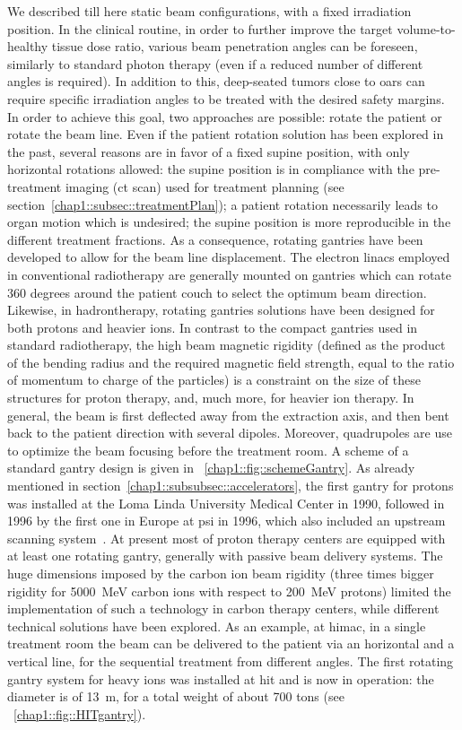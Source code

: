 We described till here static beam configurations,  with a fixed irradiation position. In the clinical routine, in order to further improve the target volume-to-healthy tissue dose ratio, various beam penetration angles can be foreseen, similarly to standard photon therapy (even if a reduced number of different angles is required). In addition to this, deep-seated tumors close to \glspl{oar} can require specific irradiation angles to be treated with the desired safety margins. In order to achieve this goal, two approaches are possible: rotate the patient or rotate the beam line. 
Even if the patient rotation solution has been explored in the past, several reasons are in favor of a fixed supine position, with only horizontal rotations allowed: the supine position is in compliance with the pre-treatment imaging (\gls{ct} scan) used for treatment planning (see section~\ref{chap1::subsec::treatmentPlan}); a patient rotation necessarily leads to organ motion which is undesired; the supine position is more reproducible in the different treatment fractions. As a consequence, rotating gantries have been developed to allow for the beam line displacement.    
The electron linacs employed in conventional radiotherapy are generally mounted on gantries which can rotate 360 degrees around the patient couch to select the optimum beam direction. 
Likewise, in hadrontherapy, rotating gantries solutions have been designed for both protons and heavier ions. In contrast to the compact gantries used in standard radiotherapy, the high beam magnetic rigidity (defined as the product of the bending radius and the required magnetic field strength, equal to the ratio of momentum to charge of the particles) is a constraint on the size of these structures for proton therapy, and, much more, for heavier ion therapy. In general, the beam is first deflected away from the extraction axis, and then bent back to the patient direction with several dipoles. Moreover, quadrupoles are use to optimize the beam focusing before the treatment room. A scheme of a standard gantry design is given in \figurename~\ref{chap1::fig::schemeGantry}. As already mentioned in section~\ref{chap1::subsubsec::accelerators}, the first gantry for protons was installed at the Loma Linda University Medical Center in 1990, followed in 1996 by the first one in Europe at \gls{psi} in 1996, which also included an upstream scanning system~\parencite{Pedroni1995}. At present most of proton therapy centers are equipped with at least one rotating gantry, generally with passive beam delivery systems.
The huge dimensions imposed by the carbon ion beam rigidity (three times bigger rigidity for 5000~MeV carbon ions with respect to 200~MeV protons) limited the implementation of such a technology in carbon therapy centers, while different technical solutions have been explored. As an example, at \gls{himac}, in a single treatment room the beam can be delivered to the patient via an horizontal and a vertical line, for the sequential treatment from different angles. The first rotating gantry system for heavy ions was installed at \gls{hit} and is now in operation: the diameter is of 13~m, for a total weight of about 700 tons (see \figurename~\ref{chap1::fig::HITgantry}).


